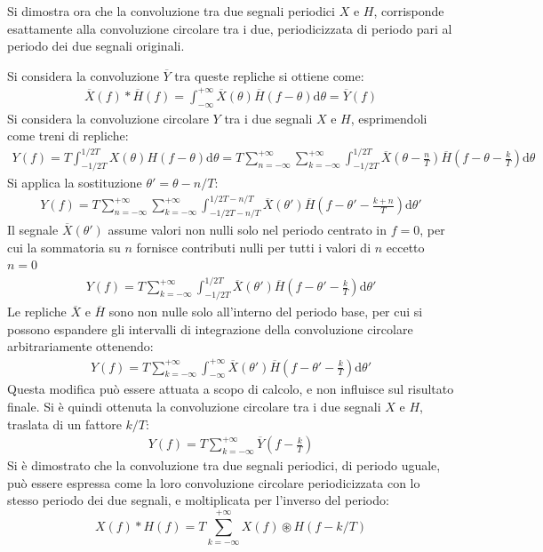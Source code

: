 \documentclass{article}
\newcommand{\df}{\mathrm{d}}
\numberwithin{equation}{subsection}
\begin{document}
Si dimostra ora che la convoluzione tra due segnali periodici $X$ e $H$, corrisponde esattamente alla convoluzione circolare tra i due, 
periodicizzata di periodo pari al periodo dei due segnali originali. 


Si considera la convoluzione $\overline{Y}$ tra queste repliche si ottiene come:
\begin{gather*}
    \overline{X}(f)*\overline{H}(f)=\displaystyle\int_{-\infty}^{+\infty}\overline{X}(\theta)\overline{H}(f-\theta)\df\theta=\overline{Y}(f)
\end{gather*}
Si considera la convoluzione circolare $Y$ tra i due segnali $X$ e $H$, esprimendoli come treni di repliche:
\begin{gather*}
    Y(f)=\displaystyle T\int_{-1/2T}^{1/2T}X(\theta)H(f-\theta)\df\theta=T\sum_{n=-\infty}^{+\infty}\sum_{k=-\infty}^{+\infty}\int_{-1/2T}^{1/2T}\overline{X}\left(\theta-\frac{n}{T}\right)\overline{H}\left(f-\theta-\frac{k}{T}\right)\df\theta
\end{gather*}
Si applica la sostituzione $\theta'=\theta-n/T$:
\begin{gather*}
    Y(f)=T\displaystyle\sum_{n=-\infty}^{+\infty}\sum_{k=-\infty}^{+\infty}\int_{-1/2T-n/T}^{1/2T-n/T}\overline{X}(\theta')\overline{H}\left(f-\theta'-\frac{k+n}{T}\right)\df\theta'
\end{gather*}
Il segnale $\overline{X}(\theta')$ assume valori non nulli solo nel periodo centrato in $f=0$, per cui la sommatoria su $n$ fornisce contributi nulli 
per tutti i valori di $n$ eccetto $n=0$
\begin{gather*}
    Y(f)=T\displaystyle\sum_{k=-\infty}^{+\infty}\int_{-1/2T}^{1/2T}\overline{X}(\theta')\overline{H}\left(f-\theta'-\frac{k}{T}\right)\df\theta'
\end{gather*}
Le repliche $\overline{X}$ e $\overline{H}$ sono non nulle solo 
all'interno del periodo base, per cui si possono espandere gli intervalli di integrazione della convoluzione circolare arbitrariamente ottenendo:
\begin{gather*}
    Y(f)=T\displaystyle\sum_{k=-\infty}^{+\infty}\int_{-\infty}^{+\infty}\overline{X}(\theta')\overline{H}\left(f-\theta'-\frac{k}{T}\right)\df\theta'
\end{gather*}
Questa modifica può essere attuata a scopo di calcolo, e non influisce sul risultato finale. Si è quindi ottenuta la convoluzione circolare tra i due segnali $X$ e 
$H$, traslata di un fattore $k/T$:
\begin{gather*}
    Y(f)=T\displaystyle\sum_{k=-\infty}^{+\infty}\overline{Y}\left(f-\frac{k}{T}\right)
\end{gather*}
Si è dimostrato che la convoluzione tra due segnali periodici, di periodo uguale, può essere espressa come la loro convoluzione circolare periodicizzata con lo stesso 
periodo dei due segnali, e moltiplicata per l'inverso del periodo:
\begin{equation}
    X(f)*H(f)=\displaystyle T\sum_{k=-\infty}^{+\infty} X(f) 
    \circledast 
    H(f-k/T)
\end{equation}
\end{document}
